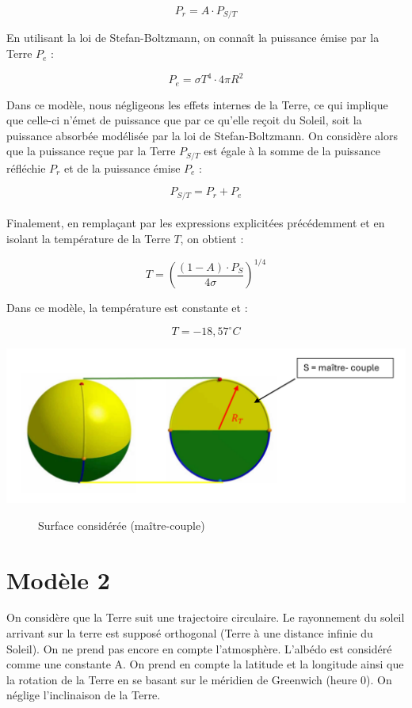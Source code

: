 \documentclass[a4paper,11pt]{article}
\begin{document}
\[ P_r = A \cdot P_{S/T} \]

En utilisant la loi de Stefan-Boltzmann, on connaît la puissance émise par la Terre $P_e$ :

\[ P_e = \sigma T^4 \cdot 4 \pi R^2 \]

Dans ce modèle, nous négligeons les effets internes de la Terre, ce qui implique que celle-ci n'émet de puissance que par ce qu'elle reçoit du Soleil, soit la puissance absorbée modélisée par la loi de Stefan-Boltzmann. On considère alors que la puissance reçue par la Terre $P_{S/T}$ est égale à la somme de la puissance réfléchie $P_r$ et de la puissance émise $P_e$ :

\[ P_{S/T} = P_r + P_e \] \\

Finalement, en remplaçant par les expressions explicitées précédemment et en isolant la température de la Terre $T$, on obtient :

\[ T = \left(\dfrac{(1 - A) \cdot P_S}{4\sigma}\right)^{1/4} \]

Dans ce modèle, la température est constante et  :

\[ T = -18,57 ^{\circ} C \]

\begin{adjustbox}{center}
\includegraphics[scale=0.9]{Schema_maitre_couple}
\end{adjustbox}
\begin{figure}[h]
  \centering
  \caption{Surface considérée (maître-couple)}
\end{figure}

\section{Modèle 2}

On considère que la Terre suit une trajectoire circulaire. Le rayonnement du soleil arrivant sur la terre est supposé orthogonal (Terre à une distance infinie du Soleil). On ne prend pas encore en compte l’atmosphère. L’albédo est considéré comme une constante A. On prend en compte la latitude et la longitude ainsi que la rotation de la Terre en se basant sur le méridien de Greenwich (heure 0). On néglige l'inclinaison de la Terre.
\end{document}
